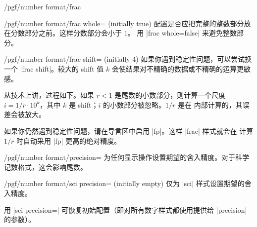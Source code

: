 \documentclass[a4paper,doc2]{ltxdoc}
\begin{document}
\begin{key}{/pgf/number format/frac}
    \begin{key}{/pgf/number format/frac whole= (initially true)}
        配置是否应把完整的整数部分放在分数部分之前。这样分数部分会小于 $1$。
        用 |frac whole=false| 来避免整数部分。
\begin{codeexample}[width=3cm]
\hspace{1em}
\hspace{1em}
\hspace{1em}
\hspace{1em}
\hspace{1em}
\end{codeexample}
    \end{key}

    \begin{key}{/pgf/number format/frac shift= (initially 4)}
        如果你遇到稳定性问题，可以尝试换一个 |frac shift|。较大的 shift 值 $k$
        会使结果对不精确的数据或不精确的运算更敏感。

        从技术上讲，过程如下。如果 $r < 1$ 是尾数的小数部分，则计算一个尺度
        $i = 1/r \cdot 10^k$，其中 $k$ 是 shift；$i$ 的小数部分被忽略。$1/r$ 是在
        内部计算的，其误差会被放大。

        如果你仍然遇到稳定性问题，请在导言区中启用 |fp|。这样 |frac| 样式就会在
        计算 $1/r$ 时自动采用 |fp| 更高的绝对精度。
    \end{key}
\end{key}

\begin{key}{/pgf/number format/precision=}
    为任何显示操作设置期望的舍入精度。对于科学记数格式，这会影响尾数。
\end{key}

\begin{key}{/pgf/number format/sci precision= (initially empty)}
    仅为 |sci| 样式设置期望的舍入精度。

    用 |sci precision={}| 可恢复初始配置（即对所有数字样式都使用提供给 |precision|
    的参数）。
\end{key}
\end{document}
